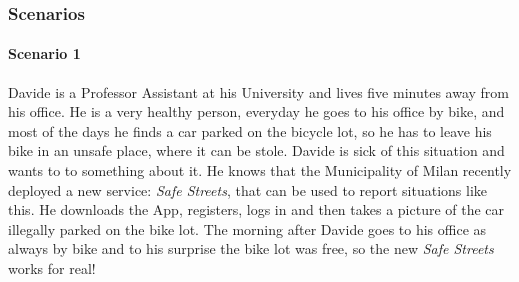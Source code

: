 \subsubsection{Scenarios}


\paragraph{Scenario 1}
Davide is a Professor Assistant at his University and lives five minutes away
from his office. He is a very healthy person, everyday he goes to his office by
bike, and most of the days he finds a car parked on the bicycle lot, so he has
to leave his bike in an unsafe place, where it can be stole. Davide is
sick of this situation and wants to to something about it. He knows that the
Municipality of Milan recently deployed a new service: \emph{Safe Streets}, that
can be used to report situations like this. He downloads the App, registers,
logs in and then takes a picture of the car illegally parked on the bike lot.
The morning after Davide goes to his office as always by bike and to his
surprise the bike lot was free, so the new \emph{Safe Streets} works for real!
